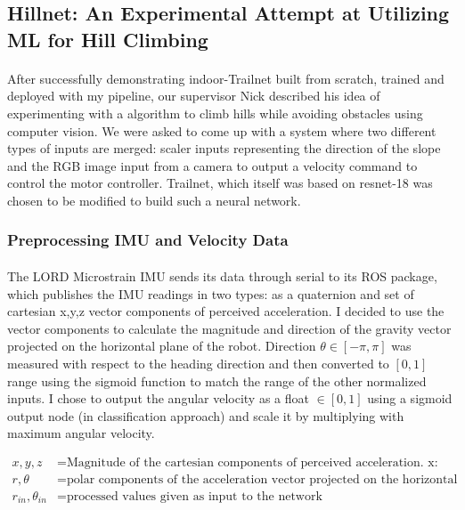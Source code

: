 
\newpage
\subsection{Hillnet: An Experimental Attempt at Utilizing ML for Hill Climbing}

\paragraph{}
After successfully demonstrating indoor-Trailnet built from scratch, trained and deployed with my pipeline, our supervisor Nick described his idea of experimenting with a algorithm to climb hills while avoiding obstacles using computer vision. We were asked to come up with a system where two different types of inputs are merged: scaler inputs representing the direction of the slope and the RGB image input from a camera to output a velocity command to control the motor controller. Trailnet, which itself was based on resnet-18 was chosen to be modified to build such a neural network.

\subsubsection{Preprocessing IMU and Velocity Data}

\paragraph{}
The LORD Microstrain IMU sends its data through serial to its ROS package, which publishes the IMU readings in two types: as a quaternion and set of cartesian x,y,z vector components of perceived acceleration. I decided to use the vector components to calculate the magnitude and direction of the gravity vector projected on the horizontal plane of the robot. Direction $\theta \in [-\pi, \pi]$ was measured with respect to the heading direction and then converted to $[0, 1]$ range using the sigmoid function to match the range of the other normalized inputs. I chose to output the angular velocity as a float $\in [0,1]$ using a sigmoid output node (in classification approach) and scale it by multiplying with maximum angular velocity.

\begin{align*}
    x, y, z   &= \text{Magnitude of the cartesian components of perceived acceleration. x: forward, z: vertical} \\
    r, \theta &= \text{polar components of the acceleration vector projected on the horizontal plane of robot} \\
    r_{in}, \theta_{in}     &= \text{processed values given as input to the network}
\end{align*}

